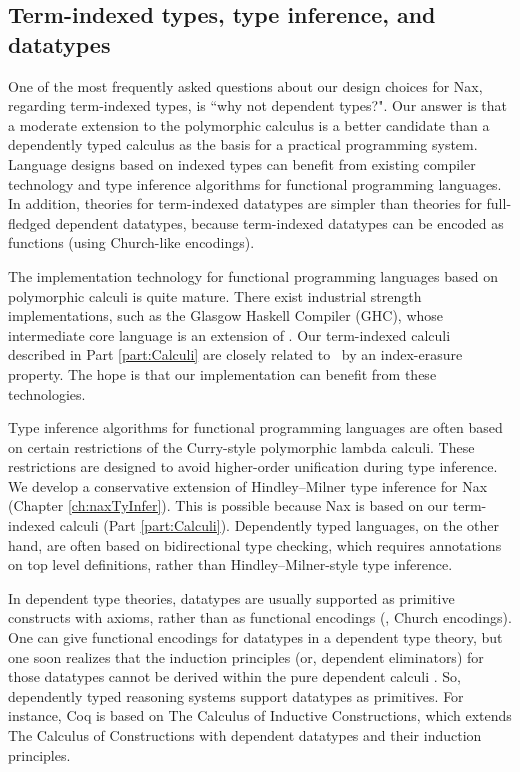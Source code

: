 \subsection{Term-indexed types, type inference, and datatypes}
\label{sec:intro:concepts:indexed}
One of the most frequently asked questions about our design choices for Nax,
regarding term-indexed types, is ``why not dependent types?". Our answer
is that a moderate extension to the polymorphic calculus is a better candidate
than a dependently typed calculus as the basis for a practical programming
system.  Language designs based on indexed types can
benefit from existing compiler technology and type inference algorithms
for functional programming languages. In addition, theories for
term-indexed datatypes are simpler than theories for full-fledged
dependent datatypes, because term-indexed datatypes can be encoded as
functions (using Church-like encodings).

The implementation technology for functional programming languages based on
polymorphic calculi is quite mature. There exist industrial
strength implementations, such as the Glasgow Haskell Compiler (GHC),
whose intermediate core language is an extension of \Fw.
Our term-indexed calculi described in Part \ref{part:Calculi} are closely
related to \Fw\ by an index-erasure property. The hope is that
our implementation can benefit from these technologies.

Type inference algorithms for functional programming languages are often
based on certain restrictions of the Curry-style polymorphic lambda calculi.
These restrictions are designed to avoid higher-order unification during
type inference.
We develop a conservative extension of Hindley--Milner type inference for
Nax (Chapter \ref{ch:naxTyInfer}). This is possible because Nax is based on our
term-indexed calculi (Part \ref{part:Calculi}). Dependently typed languages,
on the other hand, are often based on bidirectional type checking, which
requires annotations on top level definitions, rather than
Hindley--Milner-style type inference.

In dependent type theories, datatypes are usually supported as primitive
constructs with axioms, rather than as functional encodings
(\eg, Church encodings). One can give functional encodings for datatypes
in a dependent type theory, but one soon realizes that the induction principles
(or, dependent eliminators) for those datatypes cannot be derived within
the pure dependent calculi \cite{Geuvers01}.
So, dependently typed reasoning systems support datatypes as primitives.
For instance, Coq is based on The Calculus of Inductive Constructions, which
extends The Calculus of Constructions \cite{CoqHue86} with dependent datatypes
and their induction principles.

